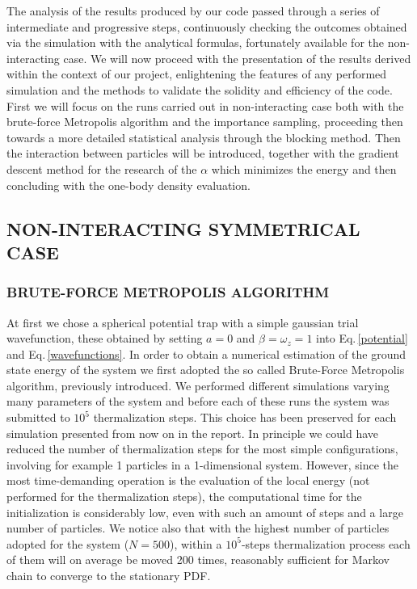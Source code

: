 The analysis of the results produced by our code passed through a series of intermediate and progressive steps, continuously checking the outcomes obtained via the simulation with the analytical formulas, fortunately available for the non-interacting case. We will now proceed with the presentation of the results derived within the context of our project, enlightening the features of any performed simulation and the methods to validate the solidity and efficiency of the code. First we will focus on the runs carried out in non-interacting case both with the brute-force Metropolis algorithm and the importance sampling, proceeding then towards a more detailed statistical analysis through the blocking method. Then the interaction between particles will be introduced, together with the gradient descent method for the research of the $\alpha$ which minimizes the energy and then concluding with the one-body density evaluation.


\subsection{NON-INTERACTING SYMMETRICAL CASE}
\subsubsection{BRUTE-FORCE METROPOLIS ALGORITHM}
At first we chose a spherical potential trap with a simple gaussian trial wavefunction, these obtained by setting $a=0$ and $\beta=\omega_z=1$ into Eq.\,\ref{potential} and Eq.\,\ref{wavefunctions}. In order to obtain a numerical estimation of the ground state energy of the system we first adopted the so called Brute-Force Metropolis algorithm, previously introduced. We performed different simulations varying many parameters of the system and before each of these runs the system was submitted to $10^5$ thermalization steps. This choice has been preserved for each simulation presented from now on in the report. In principle we could have reduced the number of thermalization steps for the most simple configurations, involving for example 1 particles in a 1-dimensional system. However, since the most time-demanding operation is the evaluation of the local energy (not performed for the thermalization steps), the computational time for the initialization is considerably low, even with such an amount of steps and a large number of particles. We notice also that with the highest number of particles adopted for the system ($N=500$), within a $10^5$-steps thermalization process each of them will on average be moved 200 times, reasonably sufficient for Markov chain to converge to the stationary PDF. \\

